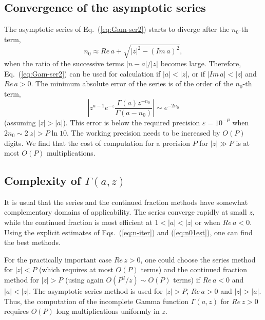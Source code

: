 \documentclass{llncs}
\begin{document}
\subsection{Convergence of the asymptotic series}

The asymptotic series of Eq.~(\ref{eq:Gam-ser2}) starts to diverge
after the $n_{0}$-th term,\begin{equation}
n_{0}\approx Re\, a+\sqrt{\left|z\right|^{2}-\left(Im\, a\right)^{2}},\end{equation}
 when the ratio of the successive terms $\left|n-a\right|/\left|z\right|$
becomes large. Therefore, Eq.~(\ref{eq:Gam-ser2}) can be used for
calculation if $\left|a\right|<\left|z\right|$, or if $\left|Im\, a\right|<\left|z\right|$
and $Re\, a>0$. The minimum absolute error of the series is of the
order of the $n_{0}$-th term,\begin{equation}
\left|z^{a-1}e^{-z}\frac{\Gamma \left(a\right)z^{-n_{0}}}{\Gamma \left(a-n_{0}\right)}\right|\sim e^{-2n_{0}}\end{equation}
(assuming $\left|z\right|>\left|a\right|$). This error is below the
required precision $\varepsilon =10^{-P}$ when $2n_{0}\sim 2\left|z\right|>P\ln 10$.
The working precision needs to be increased by $O\left(P\right)$
digits. We find that the cost of computation for a precision $P$
for $\left|z\right|\gg P$ is at most $O\left(P\right)$ multiplications.


\subsection{Complexity of $\Gamma \left(a,z\right)$}

It is usual that the series and the continued fraction methods have
somewhat complementary domains of applicability. The series converge
rapidly at small $z$, while the continued fraction is most efficient
at $1<\left|a\right|<\left|z\right|$ or when $Re\, a<0$. Using the
explicit estimates of Eqs.~(\ref{eq:n-iter}) and (\ref{eq:n01est}),
one can find the best methods. 

For the practically important case $Re\, z>0$, one could choose the
series method for $\left|z\right|<P$ (which requires at most $O\left(P\right)$
terms) and the continued fraction method for $\left|z\right|>P$ (using
again $O\left(P^{2}/z\right)\sim O\left(P\right)$ terms) if $Re\, a<0$
and $\left|a\right|<\left|z\right|$. The asymptotic series method
is used for $\left|z\right|>P$, $Re\, a>0$ and $\left|z\right|>\left|a\right|$.
Thus, the computation of the incomplete Gamma function $\Gamma \left(a,z\right)$
for $Re\, z>0$ requires $O\left(P\right)$ long multiplications uniformly
in $z$.
\end{document}

